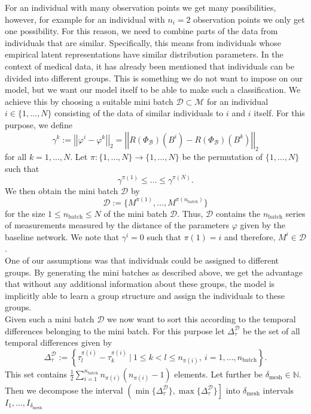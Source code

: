 \documentclass[11pt,titlepage]{article}
\newcommand{\N}{\mathbb{N}} %
\newcommand{\abs}[1]{{\left| #1 \right|}}
\theoremstyle{definition}
\theoremstyle{remark}
\begin{document}
	For an individual with many observation points we get many possibilities, however, for example for an individual with $n_i=2$ observation points we only get one possibility. For this reason, we need to combine parts  of the data from individuals that are similar. Specifically, this means from individuals whose empirical latent representations have similar distribution parameters. In the context of medical data, it has already been mentioned that individuals can be divided into different groups. This is something we do not want to impose on our model, but we want our model itself to be able to make such a classification. We achieve this by choosing a suitable mini batch $\mathcal{D}\subset \mathcal{M}$ for an individual $i\in\{1,\ldots,N\}$ consisting of the data of similar individuals to $i$ and $i$ itself. For this purpose, we define 
	\[\gamma^k := \abs{\abs{\varphi^i - \varphi^k}}_2=\abs{\abs{R(\Phi_\mathcal{B})(B^i) - R(\Phi_\mathcal{B})(B^k)}}_2\]
	for all $k=1,\ldots, N$. Let $\pi :\{1,\ldots, N\}\to \{1,\ldots, N\}$ be the permutation 
	of $\{1,\ldots, N\}$ such that 
	\[\gamma^{\pi(1)}\leq\ldots\leq \gamma^{\pi(N)}.\]
	We then obtain the mini batch $\mathcal{D}$ by
	\[\mathcal{D}:= \{M^{\pi(1)},\ldots,M^{\pi(n_{\mathrm{batch}})}\}\]
	for the size $1\leq n_\mathrm{batch}\leq N$ of the mini batch $\mathcal{D}$. Thus, $\mathcal{D}$ contains the $n_\mathrm{batch}$ series of measurements measured by the distance of the parameters $\varphi$ given by the baseline network. We note that $\gamma^i = 0$ such that $\pi(1)=i$ and therefore, $M^i\in\mathcal{D}$. \\
	One of our assumptions was that individuals could be assigned to different groups. By generating the mini batches as described above, we get the advantage that without any additional information about these groups, the model is implicitly able to learn a group structure and assign the individuals to these groups.\\
	Given such a mini batch $\mathcal{D}$ we now want to sort this according to the temporal differences belonging to the mini batch. For this purpose let $\Delta^\mathcal{D}_\tau$ be the 
	set of all temporal differences given by
	\[\Delta^\mathcal{D}_\tau := \left\{\tau^{\pi(i)}_l - \tau^{\pi(i)}_k \ \vert \ 1\leq k< l\leq n_{\pi(i)},\  i=1,\ldots,n_\mathrm{batch}\right\}.\]
	This set contains $\frac{1}{2}\sum_{i=1}^{n_\mathrm{batch}} n_{\pi(i)}(n_{\pi(i)}-1)$ elements. Let further be $\delta_\mathrm{mesh}\in\N$. Then we decompose the interval $\left(\min\{\Delta^\mathcal{D}_\tau\}, \max\{\Delta^\mathcal{D}_\tau\}\right]$ into $\delta_\mathrm{mesh}$ intervals $I_1,\ldots,I_{\delta_\mathrm{mesh}}$ 
\end{document}
